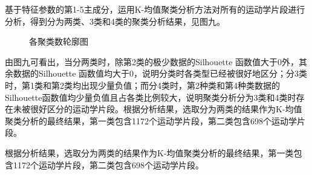 \documentclass[bwprint]{gmcmthesis}
\begin{document}

基于特征参数的第1-5主成分，运用K-均值聚类分析方法对所有的运动学片段进行分析，得到分为两类、3类和4类的聚类分析结果，见图九。
\begin{figure}[htbp] %
\centering
{}

\caption{各聚类数轮廓图}
\label{f5}
\end{figure}

由图九可看出，当分两类时，除第2类的极少数据的Silhouette 函数值大于0外，其余数据的Silhouette 函数值均大于0，说明分类时各类型已经被很好地区分；分3类时，第1类和第2类均出现少量负值；而分4类时，第2种类和第4种类数据的Silhouette函数值均少量负值且占各类比例较大，说明聚类分析分为3类和4类时存在未被很好区分的运动学片段。根据分析结果，选取分为两类的结果作为K-均值聚类分析的最终结果，第一类包含1172个运动学片段，第二类包含698个运动学片段。

根据分析结果，选取分为两类的结果作为K-均值聚类分析的最终结果，第一类包含1172个运动学片段，第二类包含698个运动学片段。
\end{document}
